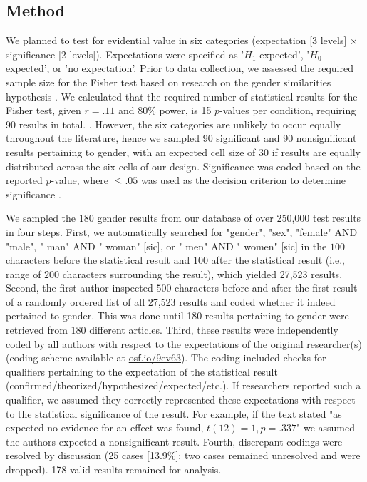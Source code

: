 \documentclass{article}
\begin{document}
\subsection*{Method}

We planned to test for evidential value in six categories (expectation [3 levels] $\times$ significance [2 levels]). Expectations were specified as '$H_1$ expected', '$H_0$ expected', or 'no expectation'. Prior to data collection, we assessed the required sample size for the Fisher test based on research on the gender similarities hypothesis \cite{Hyde2005-gj}. We calculated that the required number of statistical results for the Fisher test, given $r=.11$ \cite{Hyde2005-gj} and 80\% power, is 15 $p$-values per condition, requiring 90 results in total. . However, the six categories are unlikely to occur equally throughout the literature, hence we sampled 90 significant and 90 nonsignificant results pertaining to gender, with an expected cell size of 30 if results are equally distributed across the six cells of our design. Significance was coded based on the reported $p$-value, where $\leq.05$ was used as the decision criterion to determine significance \cite{Nuijten2015-od}.

We sampled the 180 gender results from our database of over 250,000 test results in four steps. First, we automatically searched for "gender", "sex", "female" AND "male", " man" AND " woman" [sic], or " men" AND " women" [sic] in the $100$ characters before the statistical result and $100$ after the statistical result (i.e., range of $200$ characters surrounding the result), which yielded 27,523 results. Second, the first author inspected $500$ characters before and after the first result of a randomly ordered list of all 27,523 results and coded whether it indeed pertained to gender. This was done until 180 results pertaining to gender were retrieved from 180 different articles. Third, these results were independently coded by all authors with respect to the expectations of the original researcher(s) (coding scheme available at \url{osf.io/9ev63}). The coding included checks for qualifiers pertaining to the expectation of the statistical result (confirmed/theorized/hypothesized/expected/etc.). If researchers reported such a qualifier, we assumed they correctly represented these expectations with respect to the statistical significance of the result. For example, if the text stated "as expected no evidence for an effect was found, $t(12)=1, p=.337$" we assumed the authors expected a nonsignificant result. Fourth, discrepant codings were resolved by discussion (25 cases [13.9\%]; two cases remained unresolved and were dropped). 178 valid results remained for analysis.
\end{document}
